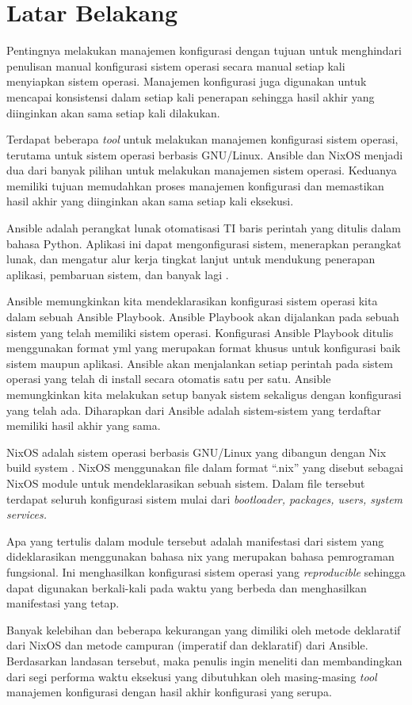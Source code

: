 \documentclass[10pt,twoside]{report}
\begin{document}
\section{Latar Belakang}
\begin{adjustwidth}{0.70cm}{}

	\hspace\parindent
	Pentingnya melakukan manajemen konfigurasi dengan tujuan untuk menghindari
	penulisan manual konfigurasi sistem operasi secara manual setiap kali
	menyiapkan sistem operasi. Manajemen konfigurasi juga digunakan untuk
	mencapai konsistensi dalam setiap kali penerapan sehingga hasil akhir yang
	diinginkan akan sama setiap kali dilakukan.

	Terdapat beberapa \textit{tool} untuk melakukan manajemen konfigurasi sistem operasi,
	terutama untuk sistem operasi berbasis GNU/Linux. Ansible dan NixOS menjadi
	dua dari banyak pilihan untuk melakukan manajemen sistem operasi. Keduanya
	memiliki tujuan memudahkan proses manajemen konfigurasi dan memastikan hasil
	akhir yang diinginkan akan sama setiap kali eksekusi.

	Ansible adalah perangkat lunak otomatisasi TI baris perintah yang ditulis
	dalam bahasa Python. Aplikasi ini dapat mengonfigurasi sistem, menerapkan
	perangkat lunak, dan mengatur alur kerja tingkat lanjut untuk mendukung
	penerapan aplikasi, pembaruan sistem, dan banyak lagi \parencite{AnsibleRedHat}.

	Ansible memungkinkan kita mendeklarasikan konfigurasi sistem operasi kita dalam
	sebuah Ansible Playbook. Ansible Playbook akan dijalankan pada sebuah sistem
	yang telah memiliki sistem operasi. Konfigurasi Ansible Playbook ditulis
	menggunakan format yml yang merupakan format khusus untuk konfigurasi baik
	sistem maupun aplikasi. Ansible akan menjalankan setiap perintah pada sistem
	operasi yang telah di install secara otomatis satu per satu. Ansible
	memungkinkan kita melakukan setup banyak sistem sekaligus dengan konfigurasi
	yang telah ada. Diharapkan dari Ansible adalah sistem-sistem yang terdaftar
	memiliki hasil akhir yang sama.

	NixOS adalah sistem operasi berbasis GNU/Linux yang dibangun dengan Nix build
	system \parencite{hownixworks} . NixOS menggunakan file dalam format “.nix”
	yang disebut sebagai NixOS module untuk mendeklarasikan sebuah sistem. Dalam
	file tersebut terdapat seluruh konfigurasi sistem mulai dari
	\textit{bootloader, packages, users, system services.}

	Apa yang tertulis dalam module tersebut adalah manifestasi dari sistem yang
	dideklarasikan menggunakan bahasa nix yang merupakan bahasa pemrograman
	fungsional. Ini menghasilkan konfigurasi sistem operasi yang \textit{reproducible}
	sehingga dapat digunakan berkali-kali pada waktu yang berbeda dan
	menghasilkan manifestasi yang tetap.

	Banyak kelebihan dan beberapa kekurangan yang dimiliki oleh metode deklaratif
	dari NixOS dan metode campuran (imperatif dan deklaratif) dari Ansible.
	Berdasarkan landasan tersebut, maka penulis ingin meneliti dan membandingkan
	dari segi performa waktu eksekusi yang dibutuhkan oleh masing-masing
	\textit{tool} manajemen konfigurasi dengan hasil akhir konfigurasi yang serupa.
\end{adjustwidth}
\end{document}
